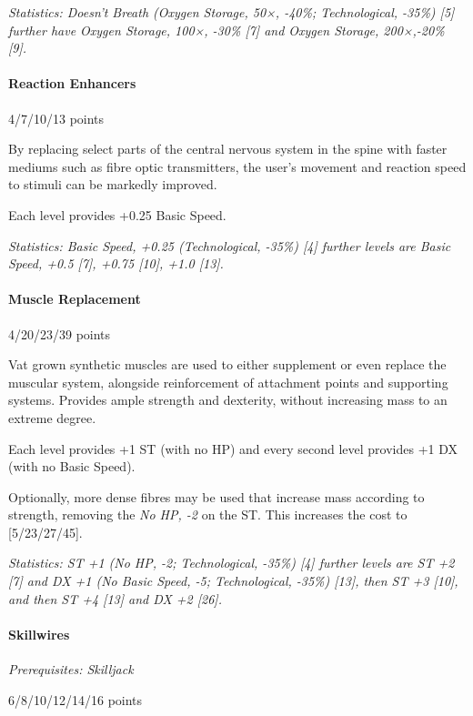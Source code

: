 \begin{multicols*}{3}
	\textit{\textcolor{OliveGreen}{Statistics: Doesn't Breath (Oxygen Storage, 50×, -40\%; Technological, -35\%) [5] further have Oxygen Storage, 100×, -30\% [7] and Oxygen Storage, 200×,-20\% [9].}}
	
	\paragraph{Reaction Enhancers}
	\begin{flushright}
		4/7/10/13 points
	\end{flushright}
	
	By replacing select parts of the central nervous system in the spine with faster mediums such as fibre optic transmitters, the user's movement and reaction speed to stimuli can be markedly improved.
	
	Each level provides +0.25 Basic Speed.
	
	\textit{\textcolor{OliveGreen}{Statistics: Basic Speed, +0.25 (Technological, -35\%) [4] further levels are Basic Speed, +0.5 [7], +0.75 [10], +1.0 [13].}}
	
	\paragraph{Muscle Replacement}
	\begin{flushright}
		4/20/23/39 points
	\end{flushright}
	
	Vat grown synthetic muscles are used to either supplement or even replace the muscular system, alongside reinforcement of attachment points and supporting systems. Provides ample strength and dexterity, without increasing mass to an extreme degree.
	
	Each level provides +1 ST (with no HP) and every second level provides +1 DX (with no Basic Speed).
	
	Optionally, more dense fibres may be used that increase mass according to strength, removing the \textit{No HP, -2} on the ST. This increases the cost to [5/23/27/45].
	
	\textit{\textcolor{OliveGreen}{Statistics: ST +1 (No HP, -2; Technological, -35\%) [4] further levels are ST +2 [7] and DX +1 (No Basic Speed, -5; Technological, -35\%) [13], then ST +3 [10], and then ST +4 [13] and DX +2 [26].}}
	
	\paragraph{Skillwires}
	\textit{Prerequisites: Skilljack}
	\begin{flushright}
		6/8/10/12/14/16 points
	\end{flushright}
	

\end{multicols*}
